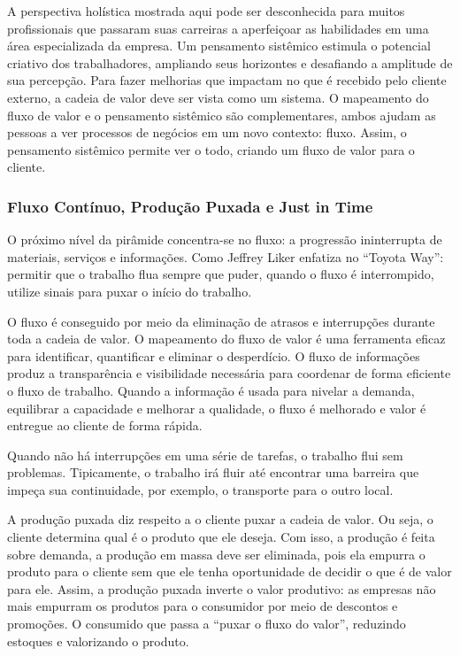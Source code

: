 A perspectiva holística mostrada aqui pode ser desconhecida para muitos profissionais que passaram suas carreiras a aperfeiçoar as habilidades em uma área especializada da empresa. Um pensamento sistêmico estimula o potencial criativo dos trabalhadores, ampliando seus horizontes e desafiando a amplitude de sua percepção. Para fazer melhorias que impactam no que é recebido pelo cliente externo, a cadeia de valor deve ser vista como um sistema. O mapeamento do fluxo de valor e o pensamento sistêmico são complementares, ambos ajudam as pessoas a ver processos de negócios em um novo contexto: fluxo. Assim, o pensamento sistêmico permite ver o todo, criando um fluxo de valor para o cliente.

\subsubsection[Fluxo Contínuo, Produção Puxada e Just in Time]{Fluxo Contínuo, Produção Puxada e Just in Time}

O próximo nível da pirâmide concentra-se no fluxo: a progressão ininterrupta de materiais, serviços e informações.  Como Jeffrey Liker enfatiza no “Toyota Way”: permitir que o trabalho flua sempre que puder, quando o fluxo é interrompido, utilize sinais para puxar o início do trabalho.

O fluxo é conseguido por meio da eliminação de atrasos e interrupções durante toda a cadeia de valor. O mapeamento do fluxo de valor é uma ferramenta eficaz para identificar, quantificar e eliminar o desperdício. O fluxo de informações produz a transparência e visibilidade necessária para coordenar de forma eficiente o fluxo de trabalho. Quando a informação é usada para nivelar a demanda, equilibrar a capacidade e melhorar a qualidade, o fluxo é melhorado e valor é entregue ao cliente de forma rápida. 

Quando não há interrupções em uma série de tarefas, o trabalho flui sem problemas. Tipicamente, o trabalho irá fluir até encontrar uma barreira que impeça sua continuidade, por exemplo, o 
transporte para o outro local. 

A produção puxada diz respeito a o cliente puxar a cadeia de valor. Ou seja, o cliente determina qual é o produto que ele deseja. Com isso, a produção é feita sobre demanda, a produção em massa deve ser eliminada, pois ela empurra o produto para o cliente sem que ele tenha oportunidade de decidir o que é de valor para ele. Assim, a produção puxada inverte o valor produtivo: as empresas não mais empurram os produtos para o consumidor por meio de descontos e promoções. O consumido que passa a “puxar o fluxo do valor”, reduzindo estoques e valorizando o produto.

